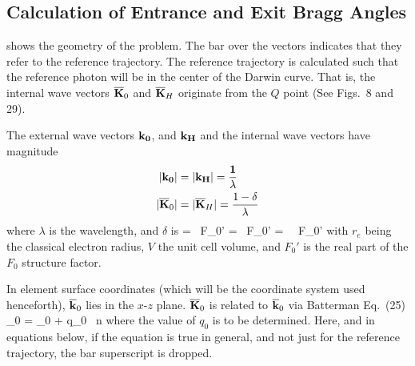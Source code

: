 \subsection{Calculation of Entrance and Exit Bragg Angles}
\label{ss:crystal.ref}

 shows the geometry of the
problem. The bar over the vectors indicates that they refer to the
reference trajectory. The reference trajectory is calculated such that
the reference photon will be in the center of the Darwin curve. That
is, the internal wave vectors $\overline{{\bf K}}_0$ and $\overline{{\bf K}}_H$ originate
from the $Q$ point (See \cite{b:batterman} Figs.~8 and 29).

The external wave vectors $\bf k_0$, and $\bf k_H$ and the internal wave vectors
have magnitude
\begin{align}
  |\bf k_0| &= |\bf k_H| = \frac{1}{\lambda} 
  \label{kk1l1} \\
  |\overline{{\bf K}}_0| &= |\overline{{\bf K}}_H| = \frac{1 - \delta}{\lambda}
  \label{kk1l2}
\end{align}
where $\lambda$ is the wavelength, and $\delta$ is
\Begineq
  \delta =  \, F_0' =  \, F_0'
  =  \, \Gamma \, F_0'
\Endeq
with $r_e$ being the classical electron radius, $V$ the unit cell
volume, and $F_0'$ is the real part of the $F_0$ structure factor. 

In element surface coordinates (which will be the coordinate system used
henceforth), $\overline{{\bf k}}_0$ lies in the $x$-$z$ plane. $\overline{{\bf K}}_0$ is
related to $\overline{{\bf k}}_0$ via Batterman Eq.~(25)
\Begineq
  \bfK_0 = \bfk_0 + q_0 \, \bfhat n
  \label{kkqn1}
\Endeq
where the value of $q_0$ is to be determined. Here, and in equations
below, if the equation is true in general, and not just for the
reference trajectory, the bar superscript is dropped.

